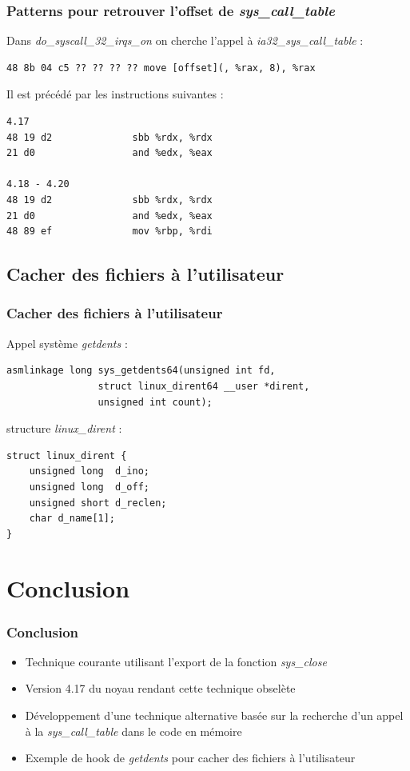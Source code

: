 \documentclass{beamer}
\begin{document}
\begin{frame}[fragile]
\frametitle{Patterns pour retrouver l'offset de \textit{sys\_call\_table}}
Dans \textit{do\_syscall\_32\_irqs\_on} on cherche l'appel à \textit{ia32\_sys\_call\_table} :
\begin{lstlisting}[style=CStyle]
48 8b 04 c5 ?? ?? ?? ?? move [offset](, %rax, 8), %rax
\end{lstlisting}
\medskip
Il est précédé par les instructions suivantes :
\begin{lstlisting}[style=CStyle]
4.17  
48 19 d2              sbb %rdx, %rdx  
21 d0                 and %edx, %eax  

4.18 - 4.20  
48 19 d2              sbb %rdx, %rdx  
21 d0                 and %edx, %eax  
48 89 ef              mov %rbp, %rdi  
\end{lstlisting}
\end{frame}

\subsection{Cacher des fichiers à l'utilisateur}

\begin{frame}[fragile]
\frametitle{Cacher des fichiers à l'utilisateur}
Appel système \textit{getdents} :
\begin{lstlisting}[style=CStyle]
asmlinkage long sys_getdents64(unsigned int fd,
				struct linux_dirent64 __user *dirent,
				unsigned int count);
\end{lstlisting}
\medskip
structure \textit{linux\_dirent} :
\begin{lstlisting}[style=CStyle]
 struct linux_dirent {
	unsigned long  d_ino;
	unsigned long  d_off;
	unsigned short d_reclen;
	char d_name[1]; 
}
\end{lstlisting}
\end{frame}

\section{Conclusion}

\begin{frame}[fragile]
\frametitle{Conclusion}
\begin{itemize}
\item 	Technique courante utilisant l'export de la fonction \textit{sys\_close}
\item 	Version 4.17 du noyau rendant cette technique obselète
\item 	Développement d'une technique alternative basée sur la recherche d'un appel à la \textit{sys\_call\_table} dans le code en mémoire
\item 	Exemple de hook de \textit{getdents} pour cacher des fichiers à l'utilisateur
\end{itemize}
\end{frame}
\end{document}
